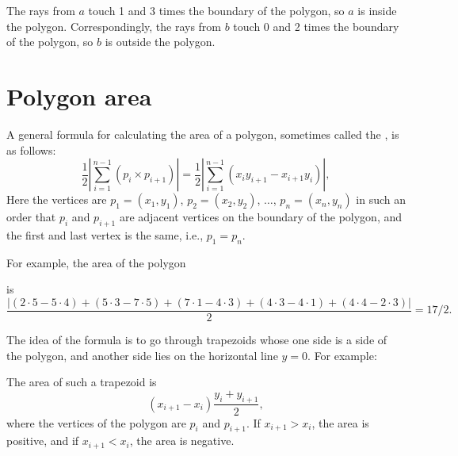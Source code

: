 The rays from $a$ touch 1 and 3 times
the boundary of the polygon,
so $a$ is inside the polygon.
Correspondingly, the rays from $b$
touch 0 and 2 times the boundary of the polygon,
so $b$ is outside the polygon.

\section{Polygon area}

A general formula for calculating the area
of a polygon, sometimes called the ,
is as follows: 
\[\frac{1}{2} |\sum_{i=1}^{n-1} (p_i \times p_{i+1})| =
\frac{1}{2} |\sum_{i=1}^{n-1} (x_i y_{i+1} - x_{i+1} y_i)|, \]
Here the vertices are
$p_1=(x_1,y_1)$, $p_2=(x_2,y_2)$, $\ldots$, $p_n=(x_n,y_n)$
in such an order that
$p_i$ and $p_{i+1}$ are adjacent vertices on the boundary
of the polygon,
and the first and last vertex is the same, i.e., $p_1=p_n$.

For example, the area of the polygon
\begin{center}
\end{center}
is
\[\frac{|(2\cdot5-5\cdot4)+(5\cdot3-7\cdot5)+(7\cdot1-4\cdot3)+(4\cdot3-4\cdot1)+(4\cdot4-2\cdot3)|}{2} = 17/2.\]

The idea of the formula is to go through trapezoids
whose one side is a side of the polygon,
and another side lies on the horizontal line $y=0$.
For example:
\begin{center}
\end{center}
The area of such a trapezoid is
\[(x_{i+1}-x_{i}) \frac{y_i+y_{i+1}}{2},\]
where the vertices of the polygon are $p_i$ and $p_{i+1}$.
If $x_{i+1}>x_{i}$, the area is positive,
and if $x_{i+1}<x_{i}$, the area is negative.

